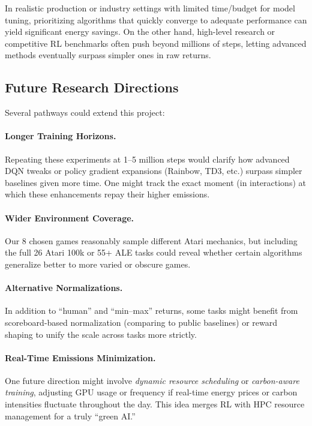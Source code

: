 In realistic production or industry settings with limited time/budget for model tuning, 
prioritizing algorithms that quickly converge to adequate performance can yield 
significant energy savings. On the other hand, high-level research or competitive RL 
benchmarks often push beyond millions of steps, letting advanced methods eventually 
surpass simpler ones in raw returns.

\subsection{Future Research Directions}
\label{subsec:future_research}

Several pathways could extend this project:

\paragraph{Longer Training Horizons.}
Repeating these experiments at 1--5 million steps would clarify how advanced DQN tweaks 
or policy gradient expansions (Rainbow, TD3, etc.) surpass simpler baselines given more time. 
One might track the exact moment (in interactions) at which these enhancements repay 
their higher emissions.

\paragraph{Wider Environment Coverage.}
Our 8 chosen games reasonably sample different Atari mechanics, but including 
the full 26 Atari 100k or 55+ ALE tasks 
could reveal whether certain algorithms generalize better to more varied or obscure games.

\paragraph{Alternative Normalizations.}
In addition to “human” and “min–max” returns, 
some tasks might benefit from scoreboard-based normalization (comparing to 
public baselines) or reward shaping to unify the scale across tasks more strictly.

\paragraph{Real-Time Emissions Minimization.}
One future direction might involve \emph{dynamic resource scheduling} or 
\emph{carbon-aware training}, adjusting GPU usage or frequency if real-time 
energy prices or carbon intensities fluctuate throughout the day. 
This idea merges RL with HPC resource management for a truly “green AI.”

